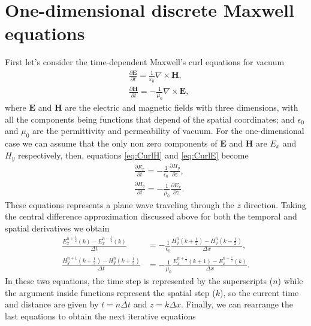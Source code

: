 \documentclass[12pt, oneside]{book}
\begin{document}
\section{One-dimensional discrete Maxwell equations}

First let's consider the time-dependent Maxwell's curl equations for vacuum \cite{jackson, griffiths}
\begin{align}
    &\frac{\partial \boldsymbol{E}}{\partial t}=\frac{1}{\varepsilon_{0}} \nabla \times \boldsymbol{H}, \label{eq:CurlH} \\
    &\frac{\partial \boldsymbol{H}}{\partial t}=-\frac{1}{\mu_{0}} \nabla \times \boldsymbol{E}, \label{eq:CurlE}
\end{align}
where $\boldsymbol{E}$ and $\boldsymbol{H}$ are the electric and magnetic fields with three dimensions, with all the components being functions that depend of the spatial coordinates; and $\epsilon_0$ and $\mu_0$ are the permittivity and permeability of vacuum. For the one-dimensional case we can assume that the only non zero components of $\boldsymbol{E}$ and $\boldsymbol{H}$ are $E_x$ and $H_y$ respectively, then, equations \ref{eq:CurlH} and \ref{eq:CurlE} become
\begin{align}
    & \frac{\partial E_x}{\partial t}=-\frac{1}{\epsilon_0}  \frac{\partial H_y}{\partial z}, \\
    & \frac{\partial H_y}{\partial t}=-\frac{1}{\mu_0} \frac{\partial E_x}{\partial z}.
\end{align}
These equations represents a plane wave traveling through the $z$ direction. Taking the central difference approximation discussed above for both the temporal and spatial derivatives we obtain \cite{Sullivan2020}
\begin{align}
    \frac{E_x^{n+\frac{1}{2}}(k)-E_x^{n-\frac{1}{2}}(k)}{\Delta t} &=-\frac{1}{\epsilon_0}\frac{H_y^n \left(k+\frac{1}{2}\right) - H_y^n\left(k-\frac{1}{2}\right)}{\Delta x}, \\
    \frac{H_y^{n+1} \left(k+\frac{1}{2}\right) -H_y^{n}\left( k +\frac{1}{2}\right)}{\Delta t} &=-\frac{1}{\mu_0}\frac{E_x^{n+\frac{1}{2}} \left(k+1\right) - E_x^{n+\frac{1}{2}}\left(k\right)}{\Delta x}.
\end{align}
In these two equations, the time step is represented by the superscripts ($n$) while the argument inside functions represent the spatial step ($k$), so the current time and distance are given by $t = n\Delta t $ and $z = k\Delta x$. Finally, we can rearrange the last equations to obtain the next iterative equations
\end{document}

